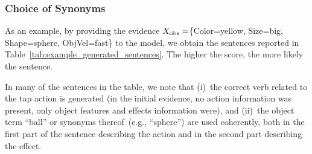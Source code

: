\subsubsection{Choice of Synonyms}
\label{sec:gestures:results:verbal:descriptions_and_synonyms}

\begin{table}
    \centering
    \caption{Affordances and verbal language: $10$-best list of sentences generated from the evidence $\xobs = \{ \text{Color=yellow, Size=big, Shape=sphere, ObjVel=fast} \}$.}
    \label{tab:example_generated_sentences}
\end{table}

As an example, by providing the evidence $X_\text{obs}=$\{Color=yellow, Size=big, Shape=sphere, ObjVel=fast\} to the model, we obtain the sentences reported in Table~\ref{tab:example_generated_sentences}.
The higher the score, the more likely the sentence.

In many of the sentences in the table, we note that
(i)~the correct verb related to the tap action is generated (in the initial evidence, no action information was present, only object features and effects information were), and
(ii)~the object term ``ball'' or synonyms thereof~(e.g., ``sphere'') are used coherently, both in the first part of the sentence describing the action and in the second part describing the effect.

